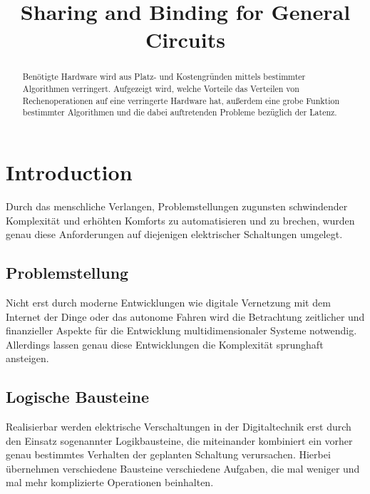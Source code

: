 \documentclass[conference]{IEEEtran}
\begin{document}
\begin{titlepage}

\title{Sharing and Binding for General Circuits\\}

\author{
}
\maketitle
\begin{abstract}
Benötigte Hardware wird aus Platz- und Kostengründen mittels bestimmter Algorithmen verringert.
Aufgezeigt wird, welche Vorteile das Verteilen von Rechenoperationen auf eine verringerte Hardware hat, außerdem eine grobe
Funktion bestimmter Algorithmen und die dabei auftretenden Probleme bezüglich der Latenz.
\end{abstract}
\end{titlepage}


\newpage
\section{Introduction}
Durch das menschliche Verlangen, Problemstellungen zugunsten schwindender Komplexität und erhöhten Komforts zu automatisieren und zu brechen, wurden genau diese Anforderungen auf diejenigen elektrischer Schaltungen umgelegt. 
\subsection{Problemstellung}
Nicht erst durch moderne Entwicklungen wie digitale Vernetzung mit dem Internet der Dinge oder das autonome Fahren wird die Betrachtung zeitlicher und finanzieller Aspekte für die Entwicklung multidimensionaler Systeme notwendig. Allerdings lassen genau diese Entwicklungen die Komplexität sprunghaft ansteigen.

\subsection{Logische Bausteine}
Realisierbar werden elektrische Verschaltungen in der Digitaltechnik erst durch den Einsatz sogenannter Logikbausteine, die miteinander kombiniert ein vorher genau bestimmtes Verhalten der geplanten Schaltung verursachen.
Hierbei übernehmen verschiedene Bausteine verschiedene Aufgaben, die mal weniger und mal mehr komplizierte Operationen beinhalten.
\end{document}
